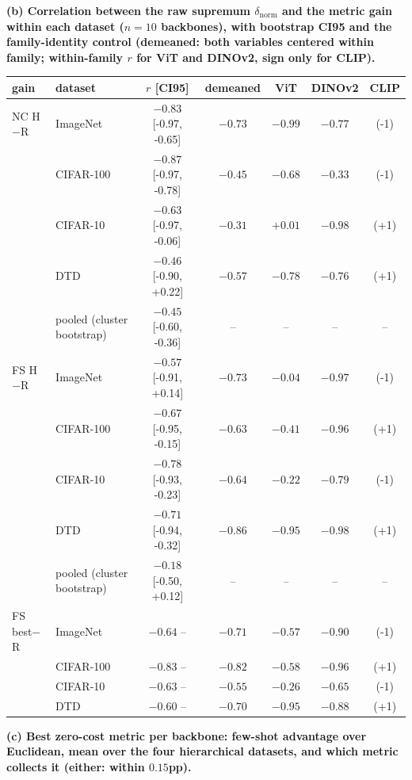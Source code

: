 \begin{table}[H]\ContinuedFloat
\centering
\scriptsize
\setlength{\tabcolsep}{2.6pt}
\begingroup
\noindent\textbf{(b) Correlation between the raw supremum $\delta_{\text{norm}}$ and the metric gain within each dataset ($n{=}10$ backbones), with bootstrap CI95 and the family-identity control (demeaned: both variables centered within family; within-family $r$ for ViT and DINOv2, sign only for CLIP).}\par\vspace{1.5pt}
\setlength{\tabcolsep}{4pt}
\begin{tabular}{llccccc}
\toprule
gain & dataset & $r$ [CI95] & demeaned & ViT & DINOv2 & CLIP \\
\midrule
NC H$-$R & ImageNet & $-0.83$ [-0.97, -0.65] & $-0.73$ & $-0.99$ & $-0.77$ & (-1) \\
 & CIFAR-100 & $-0.87$ [-0.97, -0.78] & $-0.45$ & $-0.68$ & $-0.33$ & (-1) \\
 & CIFAR-10 & $-0.63$ [-0.97, -0.06] & $-0.31$ & $+0.01$ & $-0.98$ & (+1) \\
 & DTD & $-0.46$ [-0.90, +0.22] & $-0.57$ & $-0.78$ & $-0.76$ & (+1) \\
 & pooled (cluster bootstrap) & $-0.45$ [-0.60, -0.36] & -- & -- & -- & -- \\
\midrule
FS H$-$R & ImageNet & $-0.57$ [-0.91, +0.14] & $-0.73$ & $-0.04$ & $-0.97$ & (-1) \\
 & CIFAR-100 & $-0.67$ [-0.95, -0.15] & $-0.63$ & $-0.41$ & $-0.96$ & (+1) \\
 & CIFAR-10 & $-0.78$ [-0.93, -0.23] & $-0.64$ & $-0.22$ & $-0.79$ & (-1) \\
 & DTD & $-0.71$ [-0.94, -0.32] & $-0.86$ & $-0.95$ & $-0.98$ & (+1) \\
 & pooled (cluster bootstrap) & $-0.18$ [-0.50, +0.12] & -- & -- & -- & -- \\
\midrule
FS best$-$R & ImageNet & $-0.64$ -- & $-0.71$ & $-0.57$ & $-0.90$ & (-1) \\
 & CIFAR-100 & $-0.83$ -- & $-0.82$ & $-0.58$ & $-0.96$ & (+1) \\
 & CIFAR-10 & $-0.63$ -- & $-0.55$ & $-0.26$ & $-0.65$ & (-1) \\
 & DTD & $-0.60$ -- & $-0.70$ & $-0.95$ & $-0.88$ & (+1) \\
\bottomrule
\end{tabular}
\par\vspace{5pt}
\endgroup
\begingroup
\noindent\textbf{(c) Best zero-cost metric per backbone: few-shot advantage over Euclidean, mean over the four hierarchical datasets, and which metric collects it (either: within $0.15$pp).}\par\vspace{1.5pt}

\end{table}
